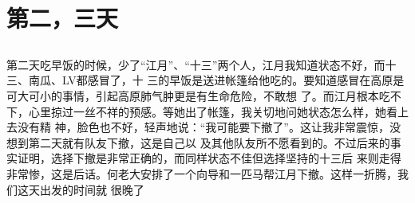 ﻿\documentclass[hyperref={bookmarks=ture}xcolor=pdflatex,svgnames,table,compress]{beamer}
\begin{document}
\section{第二，三天}

\subsection{}
\begin{frame}
\begin{center}
\end{center}
\end{frame}

\subsection{}
\begin{frame}
\begin{ztebox}
  第二天吃早饭的时候，少了“江月”、“十三”两个人，江月我知道状态不好，而十三、南瓜、LV都感冒了，十
  三的早饭是送进帐篷给他吃的。要知道感冒在高原是可大可小的事情，引起高原肺气肿更是有生命危险，不敢想
  了。而江月根本吃不下，心里掠过一丝不祥的预感。等她出了帐篷，我关切地问她状态怎么样，她看上去没有精
  神，脸色也不好，轻声地说：“我可能要下撤了”。这让我非常震惊，没想到第二天就有队友下撤，这是自己以
  及其他队友所不愿看到的。不过后来的事实证明，选择下撤是非常正确的，而同样状态不佳但选择坚持的十三后
  来则走得非常惨，这是后话。何老大安排了一个向导和一匹马帮江月下撤。这样一折腾，我们这天出发的时间就
  很晚了
\end{ztebox}
\end{frame}

\subsection{}
\begin{frame}
\end{frame}

\subsection{}
\begin{frame}
\end{frame}

\subsection{}
\begin{frame}
\end{frame}
\end{document}
